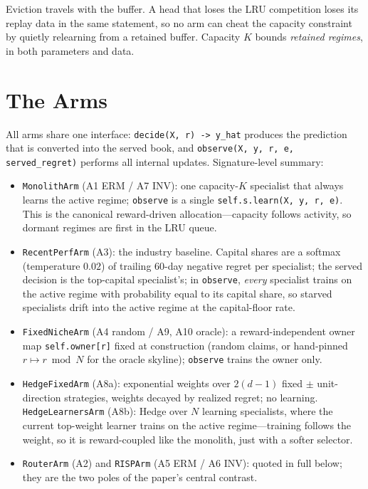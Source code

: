 \begin{keypoint}
Eviction travels with the buffer. A head that loses the LRU competition
loses its replay data in the same statement, so no arm can cheat the
capacity constraint by quietly relearning from a retained buffer. Capacity
$K$ bounds \emph{retained regimes}, in both parameters and data.
\end{keypoint}


\section{The Arms}
\label{sec:dd6-arms}

All arms share one interface: \texttt{decide(X, r) -> y\_hat} produces the
prediction that is converted into the served book, and
\texttt{observe(X, y, r, e, served\_regret)} performs all internal updates.
Signature-level summary:

\begin{itemize}
  \item \texttt{MonolithArm} (A1 ERM / A7 INV): one capacity-$K$ specialist
        that always learns the active regime; \texttt{observe} is a single
        \texttt{self.s.learn(X, y, r, e)}. This is the canonical
        reward-driven allocation---capacity follows activity, so dormant
        regimes are first in the LRU queue.
  \item \texttt{RecentPerfArm} (A3): the industry baseline. Capital shares
        are a softmax (temperature $0.02$) of trailing 60-day negative
        regret per specialist; the served decision is the top-capital
        specialist's; in \texttt{observe}, \emph{every} specialist trains on
        the active regime with probability equal to its capital share, so
        starved specialists drift into the active regime at the
        capital-floor rate.
  \item \texttt{FixedNicheArm} (A4 random / A9, A10 oracle): a
        reward-independent owner map \texttt{self.owner[r]} fixed at
        construction (random claims, or hand-pinned $r \mapsto r \bmod N$
        for the oracle skyline); \texttt{observe} trains the owner only.
  \item \texttt{HedgeFixedArm} (A8a): exponential weights over $2(d-1)$
        fixed $\pm$ unit-direction strategies, weights decayed by realized
        regret; no learning. \texttt{HedgeLearnersArm} (A8b): Hedge over $N$
        learning specialists, where the current top-weight learner trains on
        the active regime---training follows the weight, so it is
        reward-coupled like the monolith, just with a softer selector.
  \item \texttt{RouterArm} (A2) and \texttt{RISPArm} (A5 ERM / A6 INV):
        quoted in full below; they are the two poles of the paper's central
        contrast.
\end{itemize}

